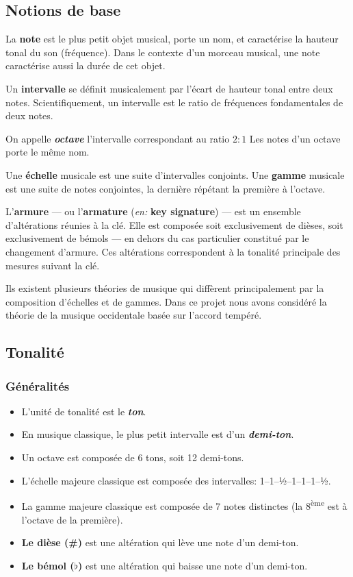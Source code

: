 \documentclass[]{article}
\providecommand{\tightlist}{%
  \setlength{\itemsep}{0pt}\setlength{\parskip}{0pt}}
\begin{document}
\hypertarget{notions-de-base}{%
\subsection{Notions de base}\label{notions-de-base}}

La \textbf{note} est le plus petit objet musical, porte un nom, et
caractérise la hauteur tonal du son (fréquence). Dans le contexte d'un
morceau musical, une note caractérise aussi la durée de cet objet.

Un \textbf{intervalle} se définit musicalement par l'écart de hauteur
tonal entre deux notes. Scientifiquement, un intervalle est le ratio de
fréquences fondamentales de deux notes.

On appelle \textbf{\emph{octave}} l'intervalle correspondant au ratio
\(2:1\) Les notes d'un octave porte le même nom.

Une \textbf{échelle} musicale est une suite d'intervalles conjoints. Une
\textbf{gamme} musicale est une suite de notes conjointes, la dernière
répétant la première à l'octave.

L'\textbf{armure} --- ou l'\textbf{armature} (\emph{en:} \textbf{key
signature}) --- est un ensemble d'altérations réunies à la clé. Elle est
composée soit exclusivement de dièses, soit exclusivement de bémols ---
en dehors du cas particulier constitué par le changement d'armure. Ces
altérations correspondent à la tonalité principale des mesures suivant
la clé.

Ils existent plusieurs théories de musique qui diffèrent principalement
par la composition d'échelles et de gammes. Dans ce projet nous avons
considéré la théorie de la musique occidentale basée sur l'accord
tempéré.

\hypertarget{tonalite}{%
\subsection{Tonalité}\label{tonalite}}

\hypertarget{generalites}{%
\subsubsection{Généralités}\label{generalites}}

\begin{itemize}
\tightlist
\item
  L'unité de tonalité est le \textbf{\emph{ton}}.
\item
  En musique classique, le plus petit intervalle est d'un
  \textbf{\emph{demi-ton}}.
\item
  Un octave est composée de 6 tons, soit 12 demi-tons.
\item
  L'échelle majeure classique est composée des intervalles:
  1--1--½--1--1--1--½.
\item
  La gamme majeure classique est composée de 7 notes distinctes (la
  8\textsuperscript{ème} est à l'octave de la première).
\item
  \textbf{Le dièse (\#)} est une altération qui lève une note d'un
  demi-ton.
\item
  \textbf{Le bémol (\(\flat\))} est une altération qui baisse une note
  d'un demi-ton.
\end{itemize}
\end{document}
